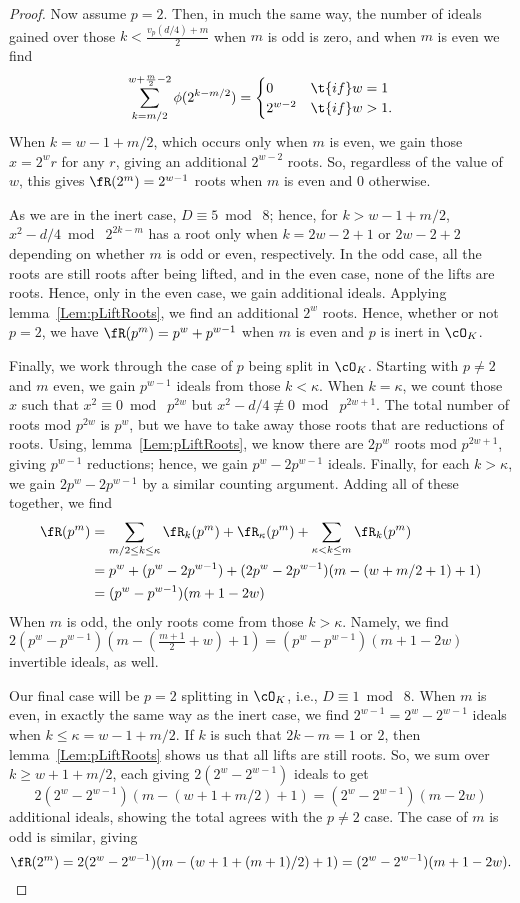 \documentclass[11pt, proquest]{uwthesis}
\begin{document}
\begin{proof}
Now assume $p=2$.
Then, in much the same way, the number of ideals gained over those $k < \frac{v_p(d/4)+m}{2}$ when $m$ is odd is zero, and when $m$ is even we find
\[
\sum_{k=m/2}^{w+\frac{m}{2}-2} \phi(2^{k-m/2})=\begin{cases}
0 &\t{ if } w = 1\\
2^{w-2} &\t{ if } w>1.
\end{cases}
\]
When $k=w-1+m/2$, which occurs only when $m$ is even, we gain those $x=2^{w}r$ for any $r$, giving an additional $2^{w-2}$ roots.
So, regardless of the value of $w$, this gives $\fR(2^m)=2^{w-1}$ roots when $m$ is even and $0$ otherwise.

As we are in the inert case, $D\equiv 5\bmod\; 8$; hence, for $k>w-1+m/2$, $x^2-d/4\bmod\;2^{2k-m}$ has a root only when $k=2w-2+1$ or $2w-2+2$ depending on whether $m$ is odd or even, respectively.
In the odd case, all the roots are still roots after being lifted, and in the even case, none of the lifts are roots.
Hence, only in the even case, we gain additional ideals.
Applying lemma~\ref{Lem:pLiftRoots}, we find an additional $2^{w}$ roots.
Hence, whether or not $p=2$, we have $\fR(p^m)=p^w+p^{w-1}$ when $m$ is even and $p$ is inert in $\cO_K$.

Finally, we work through the case of $p$ being split in $\cO_K$.
Starting with $p\ne 2$ and $m$ even, we gain $p^{w-1}$ ideals from those $k < \kappa$.
When $k=\kappa$, we count those $x$ such that $x^2\equiv 0\bmod\; p^{2w}$ but $x^2-d/4\not\equiv 0\bmod\; p^{2w+1}$.
The total number of roots mod $p^{2w}$ is $p^w$, but we have to take away those roots that are reductions of roots.
Using, lemma~\ref{Lem:pLiftRoots}, we know there are $2p^{w}$ roots mod $p^{2w+1}$, giving $p^{w-1}$ reductions; hence, we gain $p^{w} - 2p^{w-1}$ ideals.
Finally, for each $k>\kappa$, we gain $2p^{w}-2p^{w-1}$ by a similar counting argument.
Adding all of these together, we find
\begin{align*}
\fR(p^m) &= \sum_{m/2\leq k\leq \kappa} \fR_k(p^m) + \fR_\kappa(p^m) + \sum_{\kappa<k\leq m} \fR_k(p^m)\\
         &=p^w + (p^w-2p^{w-1}) + (2p^{w}-2p^{w-1})(m-(w+m/2+1)+1)\\
         &= (p^w-p^{w-1})(m+1-2w)
\end{align*}
When $m$ is odd, the only roots come from those $k>\kappa$.
Namely, we find $2(p^w-p^{w-1})(m-(\frac{m+1}{2} + w)+1) = (p^w-p^{w-1})(m+1-2w)$ invertible ideals, as well.

Our final case will be $p=2$ splitting in $\cO_K$, i.e., $D\equiv 1\bmod\; 8$.
When $m$ is even, in exactly the same way as the inert case, we find $2^{w-1}=2^w-2^{w-1}$ ideals when $k\leq \kappa = w-1+m/2$.
If $k$ is such that $2k-m = 1$ or $2$, then lemma~\ref{Lem:pLiftRoots} shows us that all lifts are still roots.
So, we sum over $k\geq w+1+m/2$, each giving $2(2^w-2^{w-1})$ ideals to get
\[
2(2^w-2^{w-1})(m-(w+1+m/2)+1) =(2^w-2^{w-1})(m-2w)
\]
additional ideals, showing the total agrees with the $p\ne2$ case.
The case of $m$ is odd is similar, giving
\[
\fR(2^m) = 2(2^w-2^{w-1})(m-(w+1+(m+1)/2)+1) =(2^w-2^{w-1})(m+1-2w).
\]
\end{proof}
\end{document}
